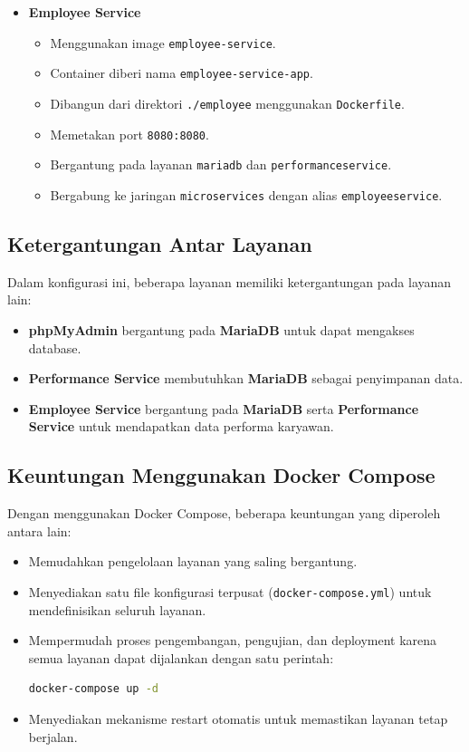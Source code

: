 \begin{itemize}
	\item \textbf{Employee Service}
	\begin{itemize}
		\item Menggunakan image \texttt{employee-service}.
		\item Container diberi nama \texttt{employee-service-app}.
		\item Dibangun dari direktori \texttt{./employee} menggunakan \texttt{Dockerfile}.
		\item Memetakan port \texttt{8080:8080}.
		\item Bergantung pada layanan \texttt{mariadb} dan \texttt{performanceservice}.
		\item Bergabung ke jaringan \texttt{microservices} dengan alias \texttt{employeeservice}.
	\end{itemize}
\end{itemize}

\subsection{Ketergantungan Antar Layanan}

Dalam konfigurasi ini, beberapa layanan memiliki ketergantungan pada layanan lain:

\begin{itemize}
	\item \textbf{phpMyAdmin} bergantung pada \textbf{MariaDB} untuk dapat mengakses database.
	\item \textbf{Performance Service} membutuhkan \textbf{MariaDB} sebagai penyimpanan data.
	\item \textbf{Employee Service} bergantung pada \textbf{MariaDB} serta \textbf{Performance Service} untuk mendapatkan data performa karyawan.
\end{itemize}

\subsection{Keuntungan Menggunakan Docker Compose}

Dengan menggunakan Docker Compose, beberapa keuntungan yang diperoleh antara lain:

\begin{itemize}
	\item Memudahkan pengelolaan layanan yang saling bergantung.
	\item Menyediakan satu file konfigurasi terpusat (\texttt{docker-compose.yml}) untuk mendefinisikan seluruh layanan.
	\item Mempermudah proses pengembangan, pengujian, dan deployment karena semua layanan dapat dijalankan dengan satu perintah:
	\begin{lstlisting}[language=bash]
		docker-compose up -d
	\end{lstlisting}
	\item Menyediakan mekanisme restart otomatis untuk memastikan layanan tetap berjalan.
\end{itemize}

